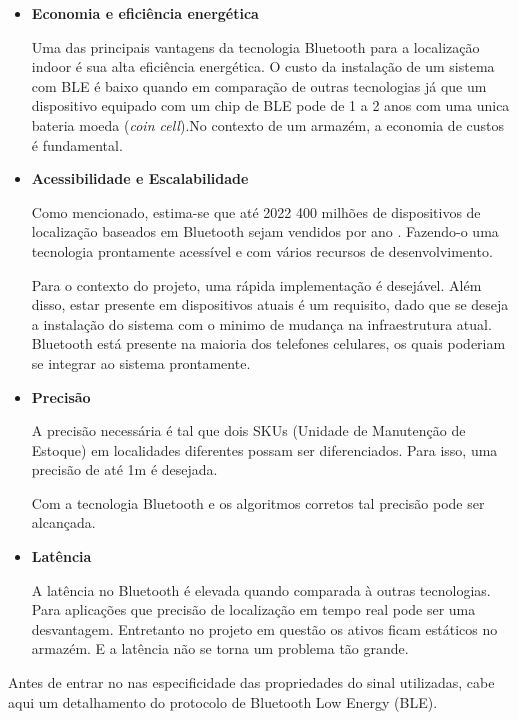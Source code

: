 \begin{itemize}

    \item \textbf{Economia e eficiência energética}

    Uma das principais vantagens da tecnologia Bluetooth para a localização indoor é sua alta eficiência energética. O custo da instalação de um sistema com BLE é baixo quando em comparação de outras tecnologias já que um dispositivo equipado com um chip de BLE pode de 1 a 2 anos com uma unica bateria moeda (\textit{coin cell}).No contexto de um armazém, a economia de custos é fundamental.

    \item \textbf{Acessibilidade e Escalabilidade}

    Como mencionado, estima-se que até 2022 400 milhões de dispositivos de localização baseados em Bluetooth sejam vendidos por ano \cite{art9}. Fazendo-o uma tecnologia prontamente acessível e com vários recursos de desenvolvimento.

    Para o contexto do projeto, uma rápida implementação é desejável. Além disso, estar presente em dispositivos atuais é um requisito, dado que se deseja a instalação do sistema com o minimo de mudança na infraestrutura atual. Bluetooth está presente na maioria dos telefones celulares, os quais poderiam se integrar ao sistema prontamente.

    \item \textbf{Precisão}

    A precisão necessária é tal que dois SKUs (Unidade de Manutenção de Estoque) em localidades diferentes possam ser diferenciados. Para isso, uma precisão de até 1m é desejada.

    Com a tecnologia Bluetooth e os algoritmos corretos tal precisão pode ser alcançada.

    \item \textbf{Latência}

    A latência no Bluetooth é elevada quando comparada à outras tecnologias. Para aplicações que precisão de localização em tempo real pode ser uma desvantagem. Entretanto no projeto em questão os ativos ficam estáticos no armazém. E a latência não se torna um problema tão grande.

\end{itemize}

Antes de entrar no nas especificidade das propriedades do sinal utilizadas, cabe aqui um detalhamento do protocolo de Bluetooth Low Energy (BLE).

